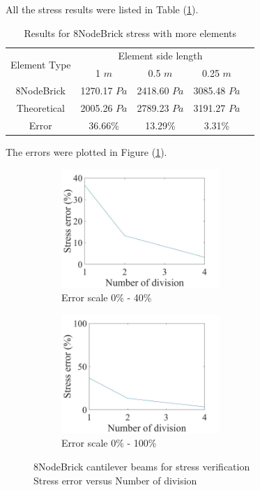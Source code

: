 \documentclass[fleqn,11pt,letter]{article}
\begin{document}
All the stress results were listed in Table (\ref{table Results for 8NodeBrick stress with more elements}). 


\begin{table}[H]
  \centering
  \caption{Results for 8NodeBrick stress with more elements}
  \label{table Results for 8NodeBrick stress with more elements}
  \begin{tabular}{|c|c|c|c|c|}
    \hline 
    \multirow{2}{*}{Element Type} 
       & \multicolumn{3}{|c|}{Element side length} \\ \cline{2-4}
       & 1 $m$ & 0.5 $m$ & 0.25 $m$ \\                              \hline
8NodeBrick & 1270.17 $Pa$ & 2418.60 $Pa$ & 3085.48 $Pa$ \\ \hline
Theoretical & 2005.26 $Pa$ & 2789.23 $Pa$ & 3191.27 $Pa$ \\ \hline
Error      & 36.66\% & 13.29\% & 3.31\%  \\ \hline
  \end{tabular}
\end{table}

The errors were plotted in Figure (\ref{fig 8NodeBrick cantilever beams for stress verification}).
\begin{figure}[H]
  \begin{subfigure}{0.5\textwidth}
    \centering
    \includegraphics[width=6cm]{../Figure_files/8NodeBrick/error8brick_beam_stress.jpeg}
    \caption{Error scale 0\% - 40\%}
  \end{subfigure}
  \begin{subfigure}{0.5\textwidth}
    \centering
    \includegraphics[width=6cm]{../Figure_files/8NodeBrick/error8brick_beam_stress100.jpeg}
    \caption{Error scale 0\% - 100\%}
  \end{subfigure}
  \captionsetup{justification=centering,margin=3cm}
  \caption{8NodeBrick cantilever beams for stress verification\\
      Stress error   versus   Number of division}
  \label{fig 8NodeBrick cantilever beams for stress verification}
\end{figure}
\end{document}
